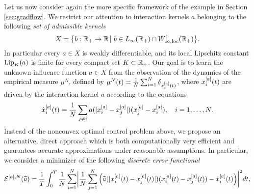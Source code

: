 Let us now consider again the more specific framework of the example in Section \ref{sec:gradflow}. We restrict our attention to interaction kernels $a$ belonging to the following \textit{set of admissible kernels}
\begin{align*}
	X=\bigl\{b:\mathbb{R}_+\rightarrow\mathbb{R}\,|\ b \in L_{\infty}(\mathbb{R}_+) \cap W^{1}_{\infty,\textup{loc}}(\mathbb{R}_+) \bigr \}.
\end{align*}
In particular every $a \in X$ is weakly differentiable, and its local Lipschitz constant $\textup{Lip}_{K}(a)$ is finite for every compact set $K \subset \mathbb{R}_+$.
Our goal is to learn the unknown influence function $a \in X$ from the observation of the dynamics of the empirical measure $\mu^N$, defined by $\mu^N(t)=\frac{1}{N} \sum_{i=1}^N \delta_{x^{[a]}_i(t)}$, where $x^{[a]}_i(t)$ are driven by the interaction kernel $a$ according to the equations 
\begin{equation}\label{fdgradientflow2}
\dot{x}^{[a]}_i(t) = \frac{1}{N} \sum_{j \neq i} a(| x^{[a]}_i -  x^{[a]}_j |) (x^{[a]}_j - x^{[a]}_i), \quad i=1,\dots,N.
\end{equation}
Instead of the nonconvex optimal control problem above, we propose an alternative, direct approach which is both computationally very efficient and guarantees accurate approximations under reasonable assumptions.
In particular, we consider a minimizer of the following \textit{discrete error functional}
\begin{align}\label{eq-def-error1}
	\begin{split}
	\mathcal E^{[a],N}(\widehat a) = \frac{1}{T}\int_0^T\frac{1}{N}\sum_{i=1}^N\biggl|\frac{1}{N}\sum_{j=1}^N
			\left(\widehat a(|x^{[a]}_i(t)-x^{[a]}_j(t)|)(x^{[a]}_i(t) - x^{[a]}_j(t))-\dot{x}^{[a]}_i(t)\right)\biggr|^2 dt,
	\end{split}
\end{align}
